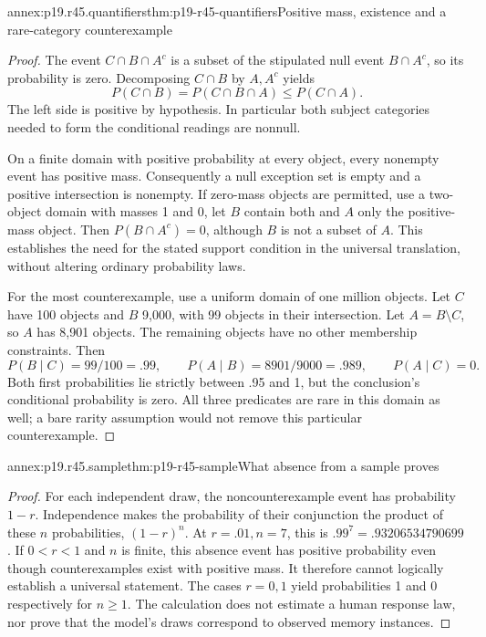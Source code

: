 \begin{annexitem}{annex:p19.r45.quantifiers}{thm:p19-r45-quantifiers}{Positive mass, existence and a rare-category counterexample}
\begin{proof}
The event \(C\cap B\cap A^c\) is a subset of the stipulated
null event \(B\cap A^c\), so its probability is zero. Decomposing
\(C\cap B\) by \(A,A^c\) yields
\[
 P(C\cap B)=P(C\cap B\cap A)\leq P(C\cap A).
\]
The left side is positive by hypothesis. In particular both subject
categories needed to form the conditional readings are nonnull.

On a finite domain with positive probability at every object, every
nonempty event has positive mass. Consequently a null exception set
is empty and a positive intersection is nonempty. If zero-mass objects
are permitted, use a two-object domain with masses 1 and 0, let \(B\)
contain both and \(A\) only the positive-mass object. Then
\(P(B\cap A^c)=0\), although \(B\) is not a subset of \(A\).
This establishes the need for the stated support condition in the
universal translation, without altering ordinary probability laws.

For the most counterexample, use a uniform domain of one million
objects. Let \(C\) have 100 objects and \(B\) 9,000, with
99 objects in their intersection. Let \(A=B\setminus C\), so
\(A\) has 8,901 objects. The remaining objects have no other
membership constraints. Then
\[
 P(B\mid C)=99/100=.99,\qquad
 P(A\mid B)=8901/9000=.989,\qquad P(A\mid C)=0.
\]
Both first probabilities lie strictly between .95 and 1, but the
conclusion's conditional probability is zero. All three predicates
are rare in this domain as well; a bare rarity assumption would not
remove this particular counterexample.
\end{proof}
\end{annexitem}

\begin{annexitem}{annex:p19.r45.sample}{thm:p19-r45-sample}{What absence from a sample proves}
\begin{proof}
For each independent draw, the noncounterexample event has probability
\(1-r\). Independence makes the probability of their conjunction
the product of these \(n\) probabilities, \((1-r)^n\).
At \(r=.01,n=7\), this is \(.99^7=.93206534790699\).
If \(0<r<1\) and \(n\) is finite, this absence event has
positive probability even though counterexamples exist with positive
mass. It therefore cannot logically establish a universal statement.
The cases \(r=0,1\) yield probabilities 1 and 0 respectively for
\(n\geq1\). The calculation does not estimate a human response
law, nor prove that the model's draws correspond to observed memory
instances.
\end{proof}
\end{annexitem}

